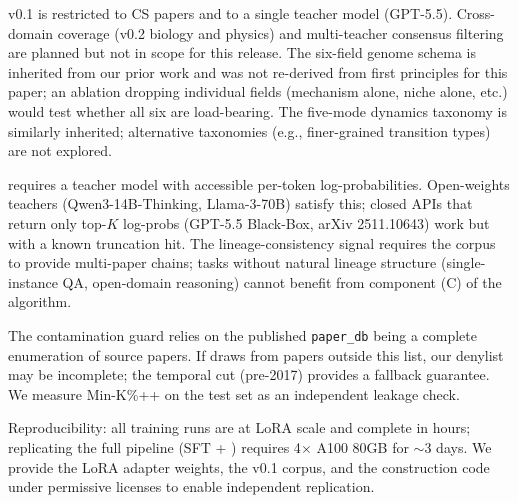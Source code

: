 \genetrace{} v0.1 is restricted to CS papers and to a single teacher
model (GPT-5.5). Cross-domain coverage (v0.2 biology and physics) and
multi-teacher consensus filtering are planned but not in scope for this
release. The six-field genome schema is inherited from our prior work
\ideaevolving{} and was not re-derived from first principles for this
paper; an ablation dropping individual fields (mechanism alone, niche
alone, etc.) would test whether all six are load-bearing. The five-mode
dynamics taxonomy is similarly inherited; alternative taxonomies (e.g.,
finer-grained transition types) are not explored.

\evoopd{} requires a teacher model with accessible per-token
log-probabilities. Open-weights teachers (Qwen3-14B-Thinking,
Llama-3-70B) satisfy this; closed APIs that return only top-$K$
log-probs (GPT-5.5 Black-Box, arXiv 2511.10643) work but with a known
truncation hit. The lineage-consistency signal requires the corpus to
provide multi-paper chains; tasks without natural lineage structure
(single-instance QA, open-domain reasoning) cannot benefit from
component (C) of the algorithm.

The contamination guard relies on the published \ideaevolving{}
\texttt{paper\_db} being a complete enumeration of \geneexam{} source
papers. If \geneexam{} draws from papers outside this list, our
denylist may be incomplete; the temporal cut (pre-2017) provides a
fallback guarantee. We measure Min-K\%++ on the test set as an
independent leakage check.

Reproducibility: all training runs are at LoRA scale and complete in
hours; replicating the full pipeline (SFT + \evoopd{}) requires 4$\times$
A100 80GB for $\sim$3 days. We provide the LoRA adapter weights, the
\genetrace{} v0.1 corpus, and the construction code under permissive
licenses to enable independent replication.
